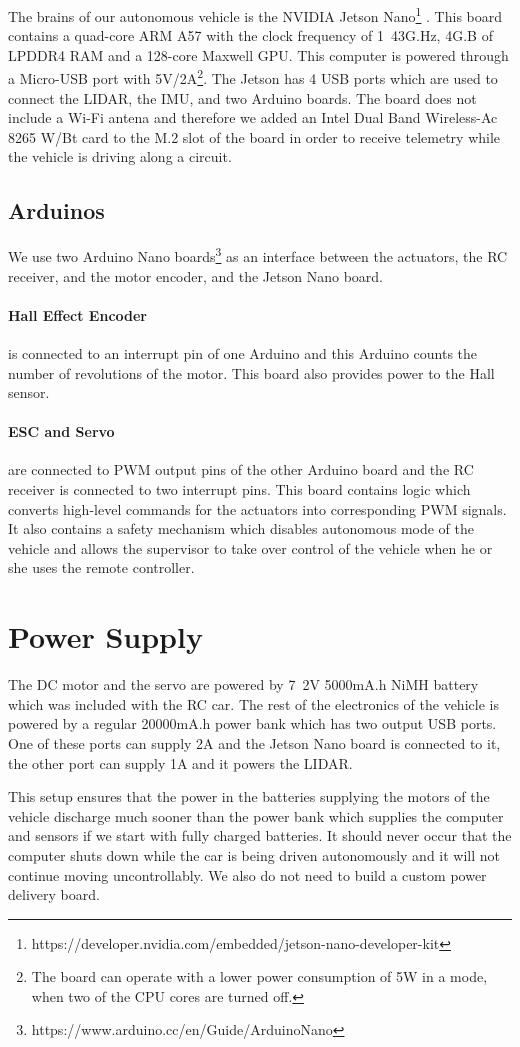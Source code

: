 The brains of our autonomous vehicle is the NVIDIA Jetson Nano\footnote{https://developer.nvidia.com/embedded/jetson-nano-developer-kit} . This board contains a quad-core ARM A57 with the clock frequency of \si{1.43}{G.Hz}, \si{4}{G.B} of LPDDR4 RAM and a 128-core Maxwell GPU. This computer is powered through a Micro-USB port with \si{5}{V}/\si{2}{A}\footnote{The board can operate with a lower power consumption of \si{5}{W} in a mode, when two of the CPU cores are turned off.}. The Jetson has 4 USB ports which are used to connect the LIDAR, the IMU, and two Arduino boards. The board does not include a Wi-Fi antena and therefore we added an Intel Dual Band Wireless-Ac 8265 W/Bt card to the M.2 slot of the board in order to receive telemetry while the vehicle is driving along a circuit.

\subsection{Arduinos}

We use two Arduino Nano boards\footnote{https://www.arduino.cc/en/Guide/ArduinoNano} as an interface between the actuators, the RC receiver, and the motor encoder, and the Jetson Nano board.

\paragraph{Hall Effect Encoder} is connected to an interrupt pin of one Arduino and this Arduino counts the number of revolutions of the motor. This board also provides power to the Hall sensor.

\paragraph{ESC and Servo} are connected to PWM output pins of the other Arduino board and the RC receiver is connected to two interrupt pins. This board contains logic which converts high-level commands for the actuators into corresponding PWM signals. It also contains a safety mechanism which disables autonomous mode of the vehicle and allows the supervisor to take over control of the vehicle when he or she uses the remote controller.

\section{Power Supply}

The DC motor and the servo are powered by \si{7.2}{V} \si{5000}{mA.h} NiMH battery which was included with the RC car. The rest of the electronics of the vehicle is powered by a regular \si{20000}{mA.h} power bank which has two output USB ports. One of these ports can supply \si{2}{A} and the Jetson Nano board is connected to it, the other port can supply \si{1}{A} and it powers the LIDAR.

This setup ensures that the power in the batteries supplying the motors of the vehicle discharge much sooner than the power bank which supplies the computer and sensors if we start with fully charged batteries. It should never occur that the computer shuts down while the car is being driven autonomously and it will not continue moving uncontrollably. We also do not need to build a custom power delivery board.